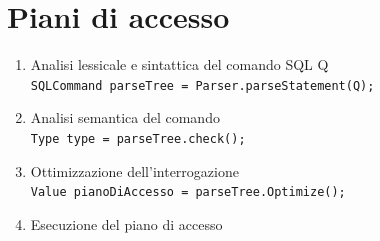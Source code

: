 \documentclass[10pt]{book}
\begin{document}
\section{Piani di accesso}
\begin{enumerate}
	\item Analisi lessicale e sintattica del comando SQL Q\\
	\texttt{SQLCommand parseTree = Parser.parseStatement(Q);}
	\item Analisi semantica del comando\\
	\texttt{Type type = parseTree.check();}
	\item Ottimizzazione dell'interrogazione\\
	\texttt{Value pianoDiAccesso = parseTree.Optimize();}
	\item Esecuzione del piano di accesso
\end{enumerate}
\end{document}
